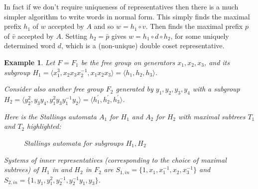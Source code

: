 \documentclass[a4paper,12pt]{article}
\newtheorem{exam}[theorem]{Example}
\newenvironment{example}{\begin{exam} \rm}{\end{exam}}
\numberwithin{equation}{section}
\numberwithin{figure}{section}
\newcommand{\la}{\langle}
\newcommand{\ra}{\rangle}
\begin{document}
In fact if we don't require uniqueness of representatives then there is
a much simpler algorithm to write words in normal form.
This
simply finds the maximal prefix $h_1$ of $w$  accepted  by $A$  and so $w=h_1\circ v$. Then finds the
maximal prefix $p$ of $\bar v$ accepted by $A$. Setting $h_2=\bar p$ gives $w=h_1\circ d \circ h_2$, for
some uniquely determined word $d$, which is a (non-unique)
double coset representative.


\begin{example}\label{ex:f_1f_2}
Let $F=F_1$ be the free group on generators $x_1,x_2,x_3$, and its
subgroup $H_1=\la x_1^3,x_2x_3x_2^{-1},x_1x_2x_3\ra = \la
h_1,h_2,h_3\ra$.

Consider also another free group $F_2$ generated by
$y_1,y_2,y_3,y_4$ with a subgroup $H_2 = \la
y_2^2,y_3y_4,y_1^2y_3y_1^{-1}y_2\ra = \la h_1^{\prime},
h_2^{\prime},h_3^{\prime}\ra$.

Here is the Stallings automata $A_1$ for $H_1$ and $A_2$ for $H_2$
with maximal subtrees $T_1$ and $T_2$ highlighted:

\begin{figure}
\begin{center}













 \hspace{15mm} 
\end{center}
\caption{Stallings automata for subgroups $H_1,
H_2$}\label{fig:stall}
\end{figure}

Systems of inner representatives (corresponding to the choice of
maximal subtrees) of $H_1$ in and $H_2$ in $F_2$
 are $S_{1,in} = \{1,x_1,x_1^{-1},x_2,x_3^{-1} \}$ and $S_{2,in} = \{1, y_1, y_1^2,
y_2^{-1}, y_2^{-1}y_1, y_3 \}$.


\end{example}
\end{document}
